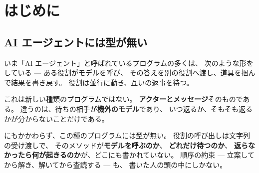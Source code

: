 \documentclass[11pt,a4paper]{ltjsarticle}
\theoremstyle{definition}
\theoremstyle{remark}
\begin{document}
\begin{abstract}
\textbf{デッドロック}については、AIPL で待ちが返らなくなる経路が\textbf{四つ}あり、
一つのものとして扱うと答えを誤ることを示す ---
循環待ち、返信されない待ち、\texttt{select} が来ないメッセージを待つ場合、
そして資源を逆順に取る場合である。
二つ目は\textbf{閉路が無くても詰まる}ことを実測で確かめた。
四つとも手を入れた結果、\textbf{待ちの宛先がクラスとして分かるか、
宛先ノードのレベルが宣言されている範囲では、デッドロック自由が型で保証される}。
成立の条件と、依然として残る範囲を明記する。

三役（立案・求解・査読）の AI エージェントを題材に、
型が何を止めるかを実測で示す --- 期限を外すと警告が出て後続の型が合わなくなり、
\texttt{ai} 効果を隠すと弾かれ、役割の順序を入れ替えるとセッション型が弾き、
失敗を確かめずに次へ渡すと型が合わない。
最新仕様の代表的なサンプル 20 本を、コード・出力・メリット・デメリットとともに解説し、
そのうち 18 本が\textbf{三つの独立な処理系で出力一致}することを確認した
（\texttt{s11} と \texttt{s16} は出力にノード名を含むため自動比較から外し、内容を目視で照合した）。
弾かれるべきプログラムは 31 本ある。
\end{abstract}

\tableofcontents
\newpage

\section{はじめに}
\label{sec:intro}

\subsection{AI エージェントには型が無い}

いま「AI エージェント」と呼ばれているプログラムの多くは、
次のような形をしている --- ある役割がモデルを呼び、
その答えを別の役割へ渡し、道具を掴んで結果を書き戻す。
役割は並行に動き、互いの返事を待つ。

これは新しい種類のプログラムではない。
\textbf{アクターとメッセージ}そのものである。
違うのは、待ちの相手が\textbf{機外のモデル}であり、
いつ返るか、そもそも返るかが分からないことだけである。

にもかかわらず、この種のプログラムには型が無い。
役割の呼び出しは文字列の受け渡しで、
そのメソッドが\textbf{モデルを呼ぶのか}、
\textbf{どれだけ待つのか}、
\textbf{返らなかったら何が起きるのか}が、どこにも書かれていない。
順序の約束 --- 立案してから解き、解いてから査読する --- も、
書いた人の頭の中にしかない。
\end{document}
